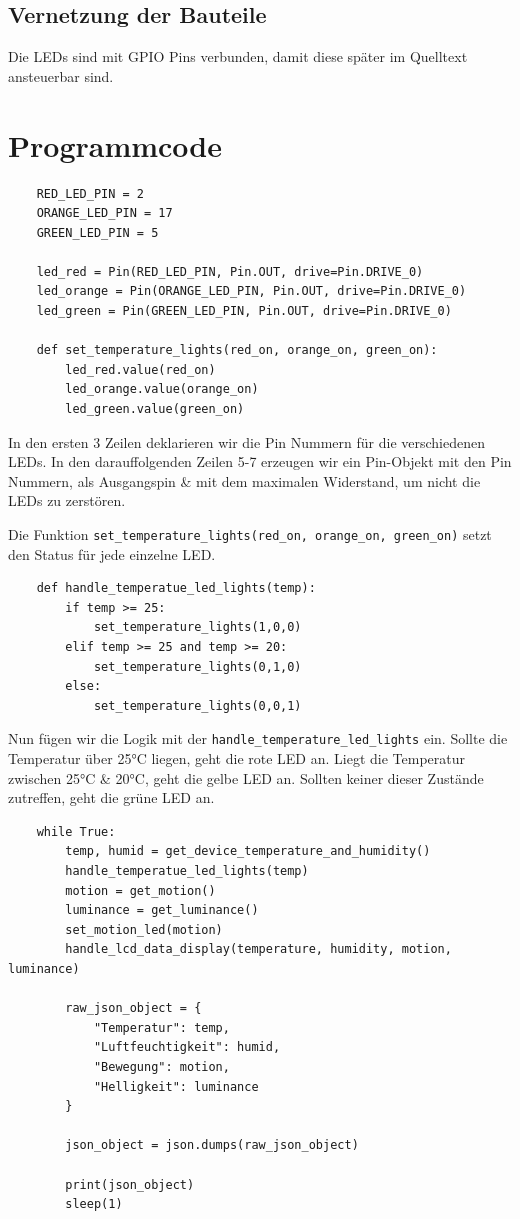 \documentclass[9pt,a4paper]{report}
\begin{document}
	\subsection{Vernetzung der Bauteile}
	Die LEDs sind mit GPIO Pins verbunden, damit diese später im Quelltext ansteuerbar sind.
	
	\newpage
	\section{Programmcode}
	\begin{lstlisting}
	RED_LED_PIN = 2
	ORANGE_LED_PIN = 17
	GREEN_LED_PIN = 5
		
	led_red = Pin(RED_LED_PIN, Pin.OUT, drive=Pin.DRIVE_0)
	led_orange = Pin(ORANGE_LED_PIN, Pin.OUT, drive=Pin.DRIVE_0)
	led_green = Pin(GREEN_LED_PIN, Pin.OUT, drive=Pin.DRIVE_0)
	
	def set_temperature_lights(red_on, orange_on, green_on):
		led_red.value(red_on)
		led_orange.value(orange_on)
		led_green.value(green_on)
	\end{lstlisting}
	In den ersten 3 Zeilen deklarieren wir die Pin Nummern für die verschiedenen LEDs. In den darauffolgenden Zeilen 5-7 erzeugen wir ein Pin-Objekt mit den Pin Nummern, als Ausgangspin \& mit dem maximalen Widerstand, um nicht die LEDs zu zerstören.
	
	Die Funktion \texttt{set\_temperature\_lights(red\_on, orange\_on, green\_on)} setzt den Status für jede einzelne LED.
	
	\begin{lstlisting}
	def handle_temperatue_led_lights(temp):
		if temp >= 25:
			set_temperature_lights(1,0,0)
		elif temp >= 25 and temp >= 20:
			set_temperature_lights(0,1,0)
		else:
			set_temperature_lights(0,0,1)
	\end{lstlisting}
	Nun fügen wir die Logik mit der \texttt{handle\_temperature\_led\_lights} ein. Sollte die Temperatur über 25°C liegen, geht die rote LED an. Liegt die Temperatur zwischen 25°C \& 20°C, geht die gelbe LED an. Sollten keiner dieser Zustände zutreffen, geht die grüne LED an.
	\newpage
	\begin{lstlisting}
	while True:
		temp, humid = get_device_temperature_and_humidity()
		handle_temperatue_led_lights(temp)
		motion = get_motion()    
		luminance = get_luminance()
		set_motion_led(motion)
		handle_lcd_data_display(temperature, humidity, motion, luminance)
	
		raw_json_object = {
			"Temperatur": temp,
			"Luftfeuchtigkeit": humid,
			"Bewegung": motion,
			"Helligkeit": luminance
		}
	
		json_object = json.dumps(raw_json_object)
	
		print(json_object)
		sleep(1)
	\end{lstlisting}
	
\end{document}
